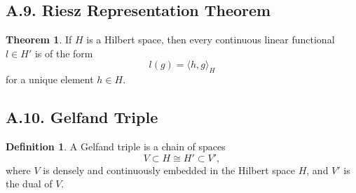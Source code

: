 \documentclass[11pt]{article}
\theoremstyle{definition}
\newtheorem{definition}{Definition}
\newtheorem{theorem}{Theorem}
\theoremstyle{remark}
\begin{document}
\subsection*{A.9. Riesz Representation Theorem}
\begin{theorem}
If \(H\) is a Hilbert space, then every continuous linear functional \(l\in H'\) is of the form
\[
l(g)=\langle h,g\rangle_H
\]
for a unique element \(h\in H\).
\end{theorem}

\subsection*{A.10. Gelfand Triple}
\begin{definition}
A Gelfand triple is a chain of spaces
\[
V\subset H\cong H'\subset V',
\]
where \(V\) is densely and continuously embedded in the Hilbert space \(H\), and \(V'\) is the dual of \(V\).
\end{definition}
\end{document}
